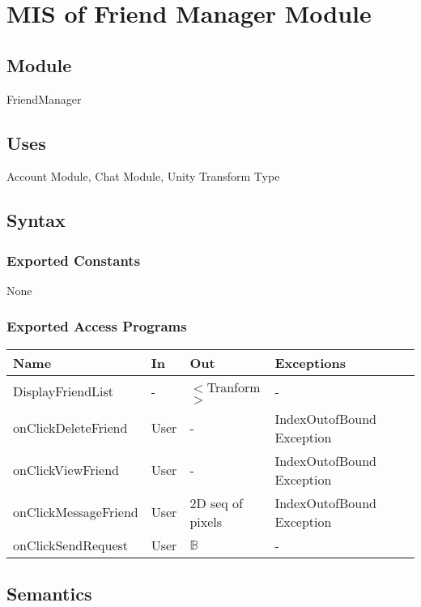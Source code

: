 \documentclass[12pt, titlepage]{article}
\begin{document}
\section{MIS of Friend Manager Module} \label{mFM}

\subsection{Module}

FriendManager

\subsection{Uses}

Account Module, Chat Module, Unity Transform Type

\subsection{Syntax}

\subsubsection{Exported Constants}
None

\subsubsection{Exported Access Programs}
\begin{center}
\begin{tabular}{p{4cm} p{2cm} p{4cm} p{4cm}}
\hline
\textbf{Name} & \textbf{In} & \textbf{Out} & \textbf{Exceptions} \\
\hline
DisplayFriendList & - & $<$Tranform$>$ & - \\
onClickDeleteFriend & User & - & IndexOutofBound Exception\\
onClickViewFriend & User & - & IndexOutofBound Exception\\
onClickMessageFriend & User & 2D seq of pixels & IndexOutofBound Exception\\
onClickSendRequest & User & $\mathbb{B}$ & -\\
\hline
\end{tabular}
\end{center}

\subsection{Semantics}
\end{document}
